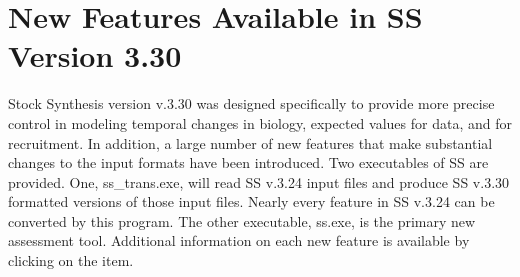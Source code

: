 \section{New Features Available in SS Version 3.30}

Stock Synthesis version v.3.30 was designed specifically to provide more precise control in modeling temporal changes in biology, expected values for data, and for recruitment.  In addition, a large number of new features that make substantial changes to the input formats have been introduced.  Two executables of SS are provided.  One, ss\_trans.exe, will read SS v.3.24 input files and produce SS v.3.30 formatted versions of those input files.  Nearly every feature in SS v.3.24 can be converted by this program.  The other executable, ss.exe, is the primary new assessment tool. Additional information on each new feature is available by clicking on the item.

